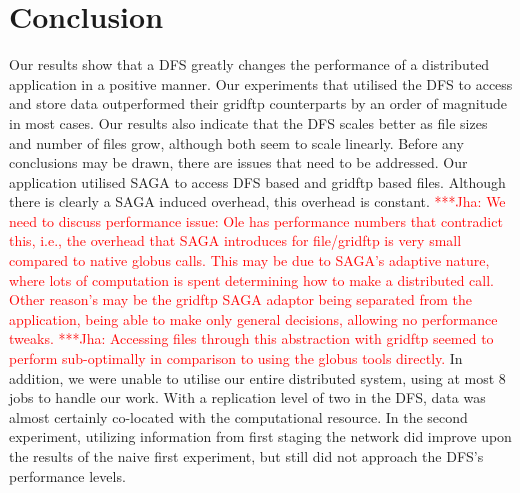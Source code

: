 \documentclass{rspublic}
\newcommand{\jhanote}[1]{ {\textcolor{red} { ***Jha: #1 }}}
\newcommand{\jhanote}[1]{}
\begin{document}
\section{Conclusion}
Our results show that a DFS greatly changes the performance of a
distributed application in a positive manner. Our experiments that
utilised the DFS to access and store data outperformed their gridftp
counterparts by an order of magnitude in most cases. Our results also
indicate that the DFS scales better as file sizes and number of files
grow, although both seem to scale linearly. Before any conclusions may
be drawn, there are issues that need to be addressed. Our application
utilised SAGA to access DFS based and gridftp based files. Although
there is clearly a SAGA induced overhead, this overhead is constant.
\jhanote{ We need to discuss performance issue: Ole has performance
numbers that contradict this, i.e., the overhead that SAGA introduces
for file/gridftp is very small compared to native globus calls. This may
be due to SAGA's adaptive nature, where lots of computation is spent
determining how to make a distributed call. Other reason's may be the
gridftp SAGA adaptor being separated from the application, being able to
make only general decisions, allowing no performance tweaks. }
\jhanote{Accessing files through this abstraction with gridftp seemed to
perform sub-optimally in comparison to using the globus tools directly.}
In addition, we were unable to utilise our entire distributed system,
using at most 8 jobs to handle our work. With a replication level of two
in the DFS, data was almost certainly co-located with the computational
resource. In the second experiment, utilizing information from first
staging the network did improve upon the results of the naive first
experiment, but still did not approach the DFS's performance levels.
\end{document}

